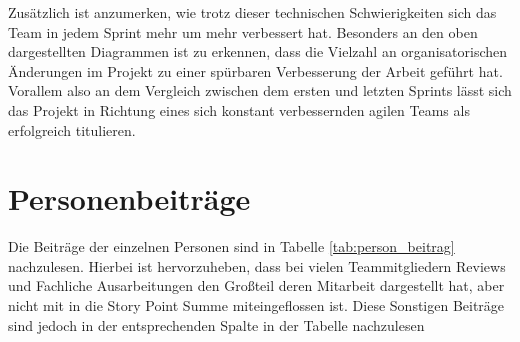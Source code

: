 Zusätzlich ist anzumerken, wie trotz dieser technischen Schwierigkeiten sich das Team in jedem Sprint mehr um mehr verbessert hat.
Besonders an den oben dargestellten Diagrammen ist zu erkennen, dass die Vielzahl an organisatorischen Änderungen im Projekt zu einer spürbaren Verbesserung der Arbeit geführt hat.
Vorallem also an dem Vergleich zwischen dem ersten und letzten Sprints lässt sich das Projekt in Richtung eines sich konstant verbessernden agilen Teams als erfolgreich titulieren.


\section{Personenbeiträge}
Die Beiträge der einzelnen Personen sind in Tabelle \ref{tab:person_beitrag} nachzulesen.
Hierbei ist hervorzuheben, dass bei vielen Teammitgliedern Reviews und Fachliche Ausarbeitungen den Großteil deren Mitarbeit dargestellt hat, aber nicht mit in die Story Point Summe miteingeflossen ist. 
Diese Sonstigen Beiträge sind jedoch in der entsprechenden Spalte in der Tabelle nachzulesen

